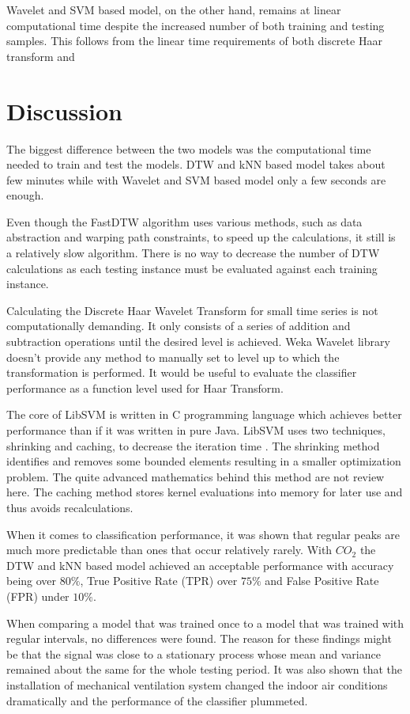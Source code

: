 Wavelet and SVM based model, on the other hand, remains at linear computational time despite the increased number of both training and testing samples. This follows from the linear time requirements of both discrete Haar transform and  

\section{Discussion}
The biggest difference between the two models was the computational time needed to train and test the models. DTW and kNN based model takes about few minutes while with Wavelet and SVM based model only a few seconds are enough. 

Even though the FastDTW algorithm uses various methods, such as data abstraction and warping path constraints, to speed up the calculations, it still is a relatively slow algorithm. There is no way to decrease the number of DTW calculations as each testing instance must be evaluated against each training instance.

Calculating the Discrete Haar Wavelet Transform for small time series is not computationally demanding. It only consists of a series of addition and subtraction operations until the desired level is achieved. Weka Wavelet library doesn't provide any method to manually set to level up to which the transformation is performed. It would be useful to evaluate the classifier performance as a function level used for Haar Transform.

The core of LibSVM is written in C programming language which achieves better performance than if it was written in pure Java. LibSVM uses two techniques, shrinking and caching, to decrease the iteration time \cite{libsvm}. The shrinking method identifies and removes some bounded elements resulting in a smaller optimization problem. The quite advanced mathematics behind this method are not review here. The caching method stores kernel evaluations into memory for later use and thus avoids recalculations.

When it comes to classification performance, it was shown that regular peaks are much more predictable than ones that occur relatively rarely. With $CO_2$ the DTW and kNN based model achieved an acceptable performance with accuracy being over $80 \%$, True Positive Rate (TPR) over $75 \%$ and False Positive Rate (FPR) under $10 \%$. 

When comparing a model that was trained once to a model that was trained with regular intervals, no differences were found. The reason for these findings might be that the signal was close to a stationary process whose mean and variance remained about the same for the whole testing period. It was also shown that the installation of mechanical ventilation system changed the indoor air conditions dramatically and the performance of the classifier plummeted.

